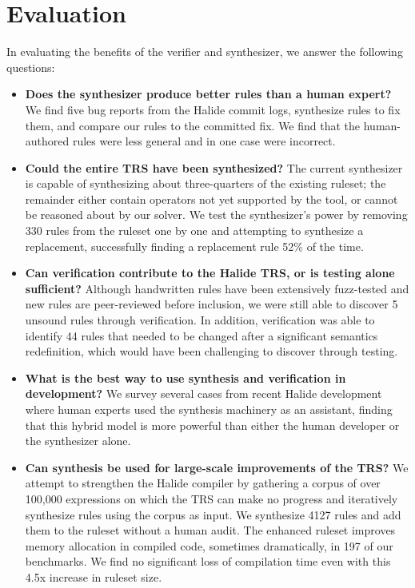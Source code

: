 \documentclass[acmsmall,review,anonymous]{acmart}\settopmatter{printfolios=true,printccs=false,printacmref=false}
\begin{document}
\section{Evaluation}

In evaluating the benefits of the verifier and synthesizer, we answer the following questions:

\begin{itemize}
  \item \textbf{Does the synthesizer produce better rules than a human expert?} We find five bug reports from the Halide commit logs, synthesize rules to fix them, and compare our rules to the committed fix. We find that the human-authored rules were less general and in one case were incorrect.
  \item \textbf{Could the entire TRS have been synthesized?} The current synthesizer is capable of synthesizing about three-quarters of the existing ruleset; the remainder either contain operators not yet supported by the tool, or cannot be reasoned about by our solver. We test the synthesizer's power by removing 330 rules from the ruleset one by one and attempting to synthesize a replacement, successfully finding a replacement rule 52\% of the time.
  \item \textbf{Can verification contribute to the Halide TRS, or is testing alone sufficient?} Although handwritten rules have been extensively fuzz-tested and new rules are peer-reviewed before inclusion, we were still able to discover 5 unsound rules through verification. In addition, verification was able to identify 44 rules that needed to be changed after a significant semantics redefinition, which would have been challenging to discover through testing.
  \item \textbf{What is the best way to use synthesis and verification in development?} We survey several cases from recent Halide development where human experts used the synthesis machinery as an assistant, finding that this hybrid model is more powerful than either the human developer or the synthesizer alone.
  \item \textbf{Can synthesis be used for large-scale improvements of the TRS?} We attempt to strengthen the Halide compiler by gathering a corpus of over 100,000 expressions on which the TRS can make no progress and iteratively synthesize rules using the corpus as input. We synthesize 4127 rules and add them to the ruleset without a human audit. The enhanced ruleset improves memory allocation in compiled code, sometimes dramatically, in 197 of our benchmarks. We find no significant loss of compilation time even with this 4.5x increase in ruleset size.
\end{itemize}
\end{document}

